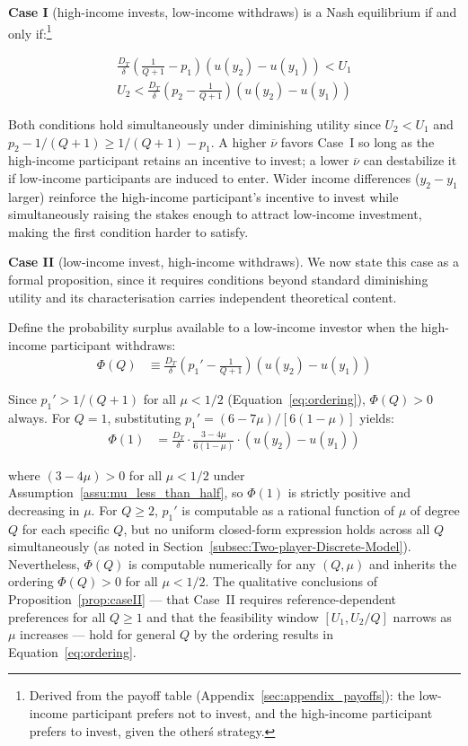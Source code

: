 \documentclass[
    oneside,
    fontsize=10pt,leqno]{article}
\begin{document}
\medskip
\noindent\textbf{Case I} (high-income invests, low-income withdraws) is a Nash
equilibrium if and only if:\footnote{Derived from the payoff table (Appendix~\ref{sec:appendix_payoffs}): the low-income participant prefers not to invest, and the high-income participant prefers to invest, given the other\'s strategy.}

\begin{gather}
\frac{D_{T}}{\delta}\left(\frac{1}{Q+1}-p_{1}\right)(u(y_{2})-u(y_{1}))<U_{1}\label{eq:caseI_poor}\\
U_{2}<\frac{D_{T}}{\delta}\left(p_{2}-\frac{1}{Q+1}\right)(u(y_{2})-u(y_{1}))\label{eq:caseI_rich}
\end{gather}

Both conditions hold simultaneously under diminishing utility since
$U_{2}<U_{1}$ and $p_{2}-1/(Q+1)\geq1/(Q+1)-p_{1}$. A higher
$\overline{\nu}$ favors Case~I so long as the high-income participant retains an incentive
to invest; a lower $\overline{\nu}$ can destabilize it if low-income
participants are induced to enter. Wider income differences ($y_{2}-y_{1}$
larger) reinforce the high-income participant's incentive to invest while
simultaneously raising the stakes enough to attract low-income investment,
making the first condition harder to satisfy.

\medskip
\noindent\textbf{Case II} (low-income invest, high-income withdraws). We now
state this case as a formal proposition, since it requires conditions
beyond standard diminishing utility and its characterisation carries
independent theoretical content.

\medskip
\noindent Define the probability surplus available to a low-income investor
when the high-income participant withdraws:
\begin{align}
\Phi(Q) & \equiv\frac{D_{T}}{\delta}\left(p_{1}'-\frac{1}{Q+1}\right)(u(y_{2})-u(y_{1}))\label{eq:Phi_def}
\end{align}

Since $p_{1}'>1/(Q+1)$ for all $\mu<1/2$ (Equation~\ref{eq:ordering}),
$\Phi(Q)>0$ always. For $Q=1$, substituting
$p_{1}'=(6-7\mu)/[6(1-\mu)]$ yields:
\begin{align}
\Phi(1) & =\frac{D_{T}}{\delta}\cdot\frac{3-4\mu}{6(1-\mu)}\cdot(u(y_{2})-u(y_{1}))\label{eq:Phi_Q1}
\end{align}

where $(3-4\mu)>0$ for all $\mu<1/2$ under Assumption~\ref{assu:mu_less_than_half},
so $\Phi(1)$ is strictly positive and decreasing in $\mu$. For
$Q\geq2$, $p_{1}'$ is computable as a rational function of $\mu$
of degree $Q$ for each specific $Q$, but no uniform closed-form
expression holds across all $Q$ simultaneously
(as noted in Section~\ref{subsec:Two-player-Discrete-Model}).
Nevertheless, $\Phi(Q)$ is computable numerically for any $(Q,\mu)$
and inherits the ordering $\Phi(Q)>0$ for all $\mu<1/2$. The qualitative
conclusions of Proposition~\ref{prop:caseII} --- that Case~II
requires reference-dependent preferences for all $Q\geq1$ and that
the feasibility window $[U_1, U_2/Q]$ narrows as $\mu$ increases
--- hold for general $Q$ by the ordering results in
Equation~\ref{eq:ordering}.
\end{document}
